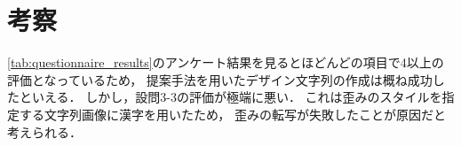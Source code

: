 \documentclass[\homedir/main.tex]{subfiles}
\begin{document}
\section{考察}\label{sec:consideration}
\cref{tab:questionnaire_results}のアンケート結果を見るとほどんどの項目で4以上の評価となっているため，
提案手法を用いたデザイン文字列の作成は概ね成功したといえる．
しかし，設問3-3の評価が極端に悪い．
これは歪みのスタイルを指定する文字列画像に漢字を用いたため，
歪みの転写が失敗したことが原因だと考えられる．

\printBibForSubfiles
\end{document}

